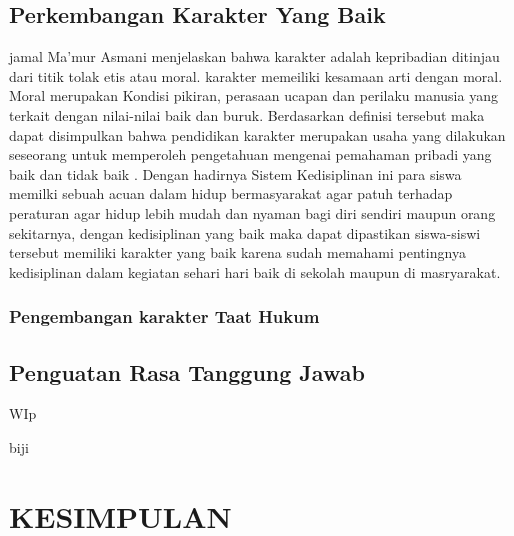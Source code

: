 \documentclass[f4paper,12pt, left=3cm,right=2cm,bottom=2cm, bahasa]{article}
\begin{document}
\subsection{Perkembangan Karakter Yang Baik}
jamal Ma'mur Asmani \cite{samrin2016pendidikan} menjelaskan bahwa karakter adalah kepribadian ditinjau dari titik tolak etis atau moral. karakter memeiliki kesamaan arti dengan moral. Moral merupakan Kondisi pikiran, perasaan ucapan dan perilaku manusia yang terkait dengan nilai-nilai baik dan buruk. Berdasarkan definisi tersebut maka dapat disimpulkan bahwa pendidikan karakter merupakan usaha yang dilakukan seseorang untuk memperoleh pengetahuan mengenai pemahaman pribadi yang baik dan tidak baik \cite{febriyanto2020pendidikan}.
Dengan hadirnya Sistem Kedisiplinan ini para siswa memilki sebuah acuan dalam hidup bermasyarakat agar patuh terhadap peraturan agar hidup lebih mudah dan nyaman bagi diri sendiri maupun orang sekitarnya, dengan kedisiplinan yang baik maka dapat dipastikan siswa-siswi tersebut memiliki karakter yang baik karena sudah memahami pentingnya kedisiplinan dalam kegiatan sehari hari baik di sekolah maupun di masryarakat.
\subsubsection{Pengembangan karakter Taat Hukum}
\subsection{Penguatan Rasa Tanggung Jawab}
WIp

biji


\section*{KESIMPULAN}
\end{document}
